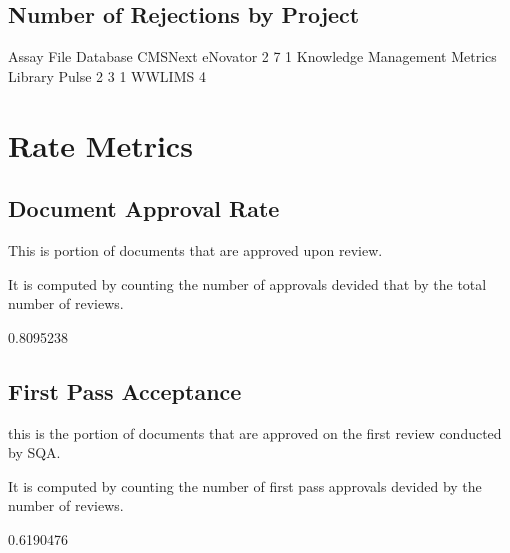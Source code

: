 \documentclass{article}
\begin{document}
\subsection{Number of Rejections by Project}

\begin{Schunk}
\begin{Soutput}
 Assay File Database              CMSNext             eNovator 
                   2                    7                    1 
Knowledge Management      Metrics Library                Pulse 
                   2                    3                    1 
              WWLIMS 
                   4 
\end{Soutput}
\end{Schunk}



\section{Rate Metrics}
\subsection{Document Approval Rate}
This is portion of documents that are approved upon review.

It is computed by counting the number of approvals devided that by the total number of reviews.

\begin{Schunk}
\begin{Soutput}
[1] 0.8095238
\end{Soutput}
\end{Schunk}

\subsection{First Pass Acceptance}
this is the portion of documents that are approved on the first review conducted
by SQA.

It is computed by counting the number of first pass approvals devided by
the number of reviews.

\begin{Schunk}
\begin{Soutput}
[1] 0.6190476
\end{Soutput}
\end{Schunk}
\end{document}

